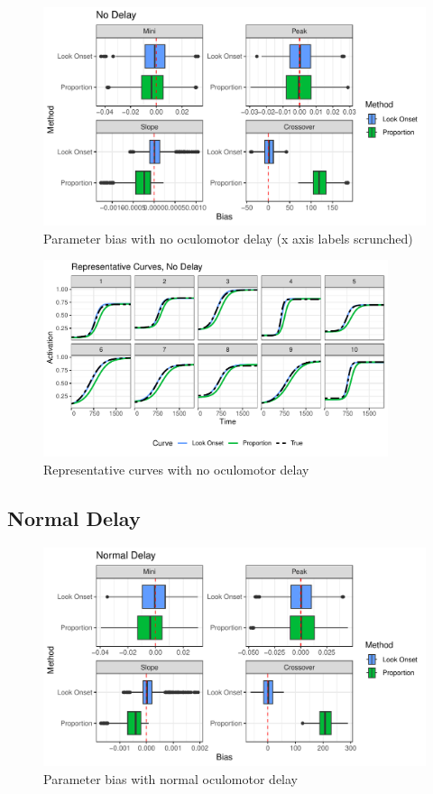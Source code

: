 \documentclass{article}
\begin{document}
\begin{figure}[H]
\centering
\includegraphics{no_delay_bar_plot.pdf}
\caption{Parameter bias with no oculomotor delay (x axis labels scrunched)}
\label{fig:par_bias_no_delay}
\end{figure}

\begin{figure}[H]
\centering
\includegraphics[width=0.9\textwidth]{rep_curves_no_delay.pdf}
\caption{Representative curves with no oculomotor delay}
\label{fig:rep_curves_no_delay}
\end{figure}
%
%
%
\subsection{Normal Delay}

\begin{figure}[H]
\centering
\includegraphics[scale=1]{normal_delay_bar_plot.pdf}
\caption{Parameter bias with normal oculomotor delay}
\label{fig:par_bias_normal_delay}
\end{figure}
\end{document}
